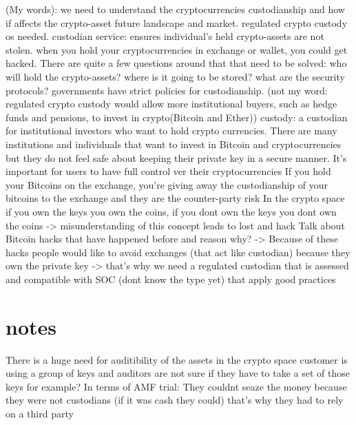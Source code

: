 (My words):
we need to understand the cryptocurrencies custodianship and how if affects the crypto-asset future landscape and market. 
regulated crypto custody os needed.
custodian service: ensures individual's held crypto-assets are not stolen.
when you hold your cryptocurrencies in exchange or wallet, you could get hacked.
There are quite a few questions around that that need to be solved: who will hold the crypto-assets? where is it going to be stored? what are the  security protocols? governments have strict policies for custodianship.
 (not my word: regulated crypto custody would allow more institutional buyers, such as hedge funds and pensions, to invest in crypto(Bitcoin and Ether))
custody: a custodian for institutional investors who want to hold crypto currencies.
There are many institutions and individuals that want to invest in Bitcoin and cryptocurrencies but they do not feel safe about keeping their private key in a secure manner.
It's important for users to have full control ver their cryptocurrencies
If you hold your Bitcoins on the exchange, you're giving away the custodianship of your bitcoins to the exchange and they are the counter-party risk
In the crypto space if you own the keys you own the coins, if you dont own the keys you dont own the coins -> misunderstanding of this concept leads to lost and hack
Talk about Bitcoin hacks that have happened before and reason why? -> Because of these hacks people would like to avoid exchanges (that act like custodian) because they own the private key -> that's why we need a regulated custodian that is assessed and compatible with SOC (dont know the type yet) that apply good practices


\section{notes}

There is a huge need for auditibility of the assets in the crypto space
customer is using a group of keys and auditors are not sure if they have to take a set of those keys for example?
In terms of AMF trial: They couldnt seaze the money because they were not custodians (if it was cash they could) that's why they had to rely on a third party 










\nocite{*}
